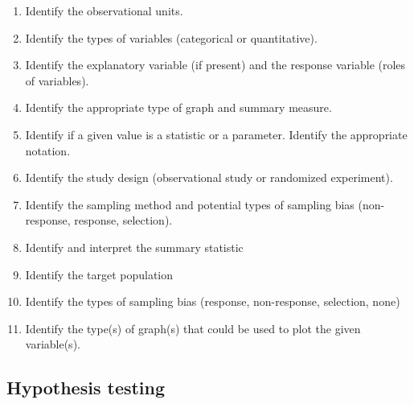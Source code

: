 \documentclass[
]{report}
\begin{document}
\begin{enumerate}
\def\labelenumi{\arabic{enumi}.}
\item
  Identify the observational units.
\item
  Identify the types of variables (categorical or quantitative).
\item
  Identify the explanatory variable (if present) and the response variable (roles of variables).
\item
  Identify the appropriate type of graph and summary measure.
\item
  Identify if a given value is a statistic or a parameter. Identify the appropriate notation.
\item
  Identify the study design (observational study or randomized experiment).
\item
  Identify the sampling method and potential types of sampling bias (non-response, response, selection).
\item
  Identify and interpret the summary statistic
\item
  Identify the target population
\item
  Identify the types of sampling bias (response, non-response, selection, none)
\item
  Identify the type(s) of graph(s) that could be used to plot the given variable(s).
\end{enumerate}

\subsection*{Hypothesis testing}\label{hypothesis-testing}
\end{document}
